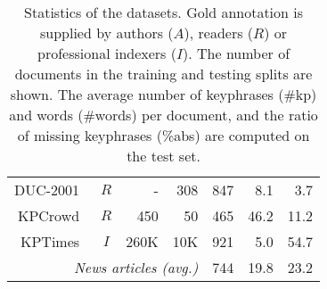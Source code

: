 \begin{table}[ht!]
\begin{tabular}{@{}rcrrrrr}
    DUC-2001~\cite{wan_single_2008} & $R$ & -   & 308 & 847 & 8.1    &  3.7 \\
    KPCrowd~\cite{marujo_supervised_2012}                  & $R$ & 450 & 50  & 465 & 46.2   & 11.2 \\
    KPTimes~\cite{gallina_kptimes_2019}     & $I$ & 260K & 10K & 921 & 5.0 &  54.7 \\
    
    \cmidrule{5-7} %
    \multicolumn{4}{r}{\textit{News articles (avg.)}} &    744 &  19.8 & 23.2 \\

    \cmidrule[1pt]{1-7}
    
    \end{tabular}
\caption{Statistics of the datasets. Gold annotation is supplied by authors ($A$), readers ($R$) or professional indexers ($I$). The number of documents in the training and testing splits are shown. The average number of keyphrases (\#kp) and words (\#words) per document, and the ratio of missing keyphrases (\%abs) are computed on the test set.} %
\label{tab:benchmark_datasets}
\end{table}